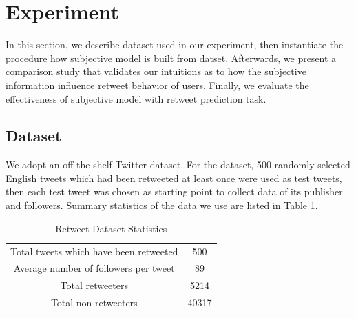 \documentclass{acm_proc_article-sp}
\begin{document}
\section{Experiment}
In this section, we describe dataset used in our experiment, then instantiate the procedure how subjective model is built from datset. Afterwards, we present a comparison study that validates our intuitions as to how the subjective information influence retweet behavior of users. Finally, we evaluate the effectiveness of subjective model with retweet prediction task.
\subsection{Dataset}
We adopt an off-the-shelf Twitter dataset\cite{Luo:2013Sig}.
For the dataset, 500 randomly selected English tweets which had been retweeted at least once were used as test tweets, then each test tweet was chosen as starting point to collect data of its publisher and followers.
Summary statistics of the data we use are listed in Table 1.
\begin{table}
\centering
\caption{Retweet Dataset Statistics}
\begin{tabular}{|c|c|}
\hline
Total tweets which have been retweeted & 500 \\
Average number of followers per tweet & 89 \\
Total retweeters & 5214 \\
Total non-retweeters & 40317  \\
\hline
\end{tabular}
\end{table}
\end{document}
